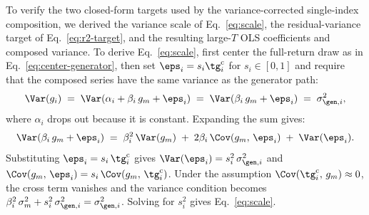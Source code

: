 To verify the two closed-form targets used by the variance-corrected
single-index composition, we derived the variance scale of
Eq.~\eqref{eq:scale}, the residual-variance target of
Eq.~\eqref{eq:r2-target}, and the resulting large-$T$ OLS coefficients
and composed variance. To derive Eq.~\eqref{eq:scale}, first center the full-return
draw as in Eq.~\eqref{eq:center-generator}, then set
$\eps_i=s_i\tg_i^{\mathrm c}$ for $s_i\in[0,1]$ and require
that the composed series have the same variance as the generator
path:
\begin{equation}
  \Var(g_i) \;=\; \Var(\alpha_i + \beta_i\, g_m + \eps_i)
            \;=\; \Var(\beta_i\, g_m + \eps_i)
            \;=\; \sigma_{\gen,i}^2,
\end{equation}
where $\alpha_i$ drops out because it is constant. Expanding the sum
gives:
\begin{equation}
  \Var(\beta_i\, g_m + \eps_i) \;=\; \beta_i^2\, \Var(g_m)
  \;+\; 2 \beta_i\, \Cov(g_m,\, \eps_i)
  \;+\; \Var(\eps_i).
\end{equation}
Substituting $\eps_i = s_i\,\tg_i^{\mathrm c}$ gives
$\Var(\eps_i) = s_i^2\,\sigma_{\gen,i}^2$ and
$\Cov(g_m,\, \eps_i) = s_i\,\Cov(g_m,\, \tg_i^{\mathrm c})$. Under the
assumption $\Cov(\tg_i^{\mathrm c},\,g_m)\approx0$, the cross term vanishes and
the variance condition becomes
$\beta_i^2\, \sigma_m^2 + s_i^2\, \sigma_{\gen,i}^2 =
\sigma_{\gen,i}^2$. Solving for $s_i^2$ gives Eq.~\eqref{eq:scale}.

